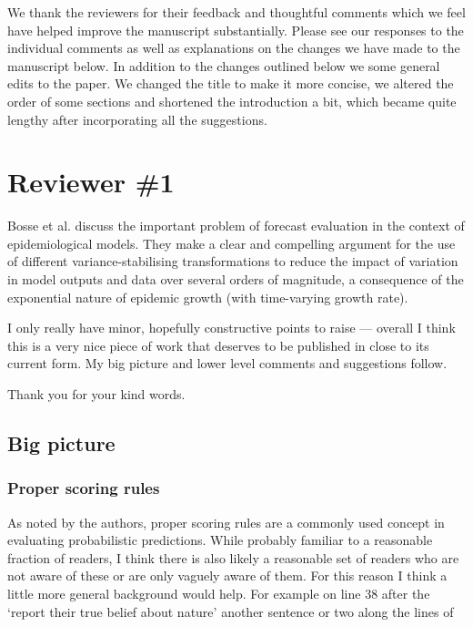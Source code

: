 \documentclass{article}
\newcommand{\red}{\color{red}}
\newcommand{\black}{\color{black}}
\newcommand{\blue}{\color{blue}}
\begin{document}


\black
We thank the reviewers for their feedback and thoughtful comments which we feel have helped improve the manuscript substantially. Please see our responses to the individual comments as well as explanations on the changes we have made to the manuscript below. 
In addition to the changes outlined below we some general edits to the paper. We changed the title to make it more concise, we altered the order of some sections and shortened the introduction a bit, which became quite lengthy after incorporating all the suggestions. 


\section{Reviewer \#1}

\blue
Bosse et al. discuss the important problem of forecast evaluation in the context of epidemiological models. They make a clear and compelling argument for the use of different variance-stabilising transformations to reduce the impact of variation in model outputs and data over several orders of magnitude, a consequence of the exponential nature of epidemic growth (with time-varying growth rate).

I only really have minor, hopefully constructive points to raise — overall I think this is a very nice piece of work that deserves to be published in close to its current form. My big picture and lower level comments and suggestions follow.

\black
Thank you for your kind words.

\blue
\subsection{Big picture}
\subsubsection{Proper scoring rules}
As noted by the authors, proper scoring rules are a commonly used concept in evaluating probabilistic predictions. While probably familiar to a reasonable fraction of readers, I think there is also likely a reasonable set of readers who are not aware of these or are only vaguely aware of them. For this reason I think a little more general background would help. For example on line 38 after the ‘report their true belief about nature’ another sentence or two along the lines of
\end{document}
